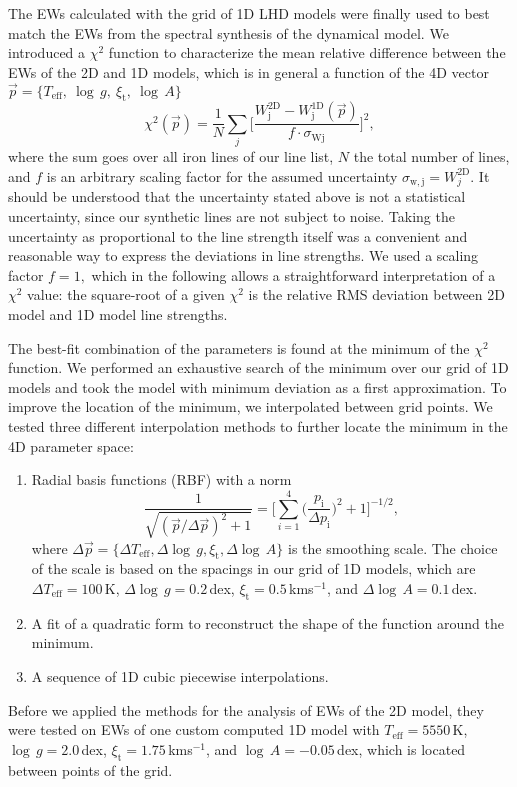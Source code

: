 \documentclass{aa}
\newcommand{\kmos}{kms$^{-1}$}
\begin{document}
The EWs calculated with the grid of 1D LHD models were
finally used to best match the EWs from the spectral synthesis of the dynamical model.
We introduced a $\chi^2$ function to characterize the mean relative difference
between the EWs of the 2D and 1D models, which is in general a function of the
4D vector $\vec p=\big\{
T_\mathrm{eff},\ \log\,g,\ \xi_\mathrm{t},\ \log\,A \big\}$
%
\begin{equation}
    \chi^2( \vec p )= \frac{1}{N} \sum_{j} 
    \Bigg [\frac{W^\mathrm{2D}_\mathrm{j} - 
    W^\mathrm{1D}_\mathrm{j} (\vec p )}{f \cdot \sigma_\mathrm{Wj} } 
    \Bigg ]^2,
\end{equation}
%
where the sum goes over all iron lines of our line list, $N$ the total number
of lines, and $f$ is an arbitrary scaling factor for the assumed uncertainty
$\sigma_\mathrm{w,j}=W^\mathrm{2D}_j$. It should be understood that the
uncertainty stated above is not a statistical uncertainty, since our synthetic
lines are not subject to noise.  Taking the uncertainty as proportional to the
line strength itself was a convenient and reasonable way to express the
deviations in line strengths. We used a scaling factor $f=1,$ which in the
following allows a straightforward interpretation of a $\chi^2$ value: the
square-root of a given $\chi^2$ is the relative RMS deviation between 2D model 
and 1D model line strengths.

The best-fit combination of the parameters is found at the minimum of the
$\chi^2$ function.  We performed an exhaustive search of the minimum over our
grid of 1D models and took the model with minimum deviation as a first
approximation. To improve the location of the minimum, we interpolated between
grid points. We tested three different interpolation methods to further locate
the minimum in the 4D parameter space:
%
\begin{enumerate}
\item Radial basis functions (RBF) with a norm  
\begin{equation} \label{eq:rbfnorm}
\frac{1}{\sqrt{(\vec p /\Delta \vec p )^2 +1}}= 
\Big[ \sum_{i=1}^4 \Big ( \frac{p_\mathrm{i}}{\Delta p_\mathrm{i}} 
\Big)^2 +1 \Big]^{-1/2},
\end{equation}
where $\Delta \vec p = 
\big\{  \Delta T_\mathrm{eff},\Delta  \log\,g, 
\xi_\mathrm{t},  \Delta \log\,A  \big\}$  is the smoothing scale. 
The choice of the scale is based on the spacings in our grid of 1D models, which
are $\Delta T_\mathrm{eff}=100$\,K, 
$\Delta\log\,g=0.2$\,dex, $\xi_\mathrm{t}=0.5$\,\kmos, and 
$\Delta\log\,A=0.1$\,dex.
\item A fit of a quadratic form to reconstruct the 
shape of the function around the minimum.
\item A sequence of 1D cubic piecewise interpolations.
\end{enumerate}
%
Before we applied the methods for the analysis of EWs of the 2D model, they were
tested on EWs of one custom computed 1D model with
$T_\mathrm{eff}=5550$\,K, $\log\,g=2.0$\,dex, $\xi_\mathrm{t}=1.75$\,\kmos, and
$\log\,A=-0.05$\,dex, which is located between points of the grid.
\end{document}
